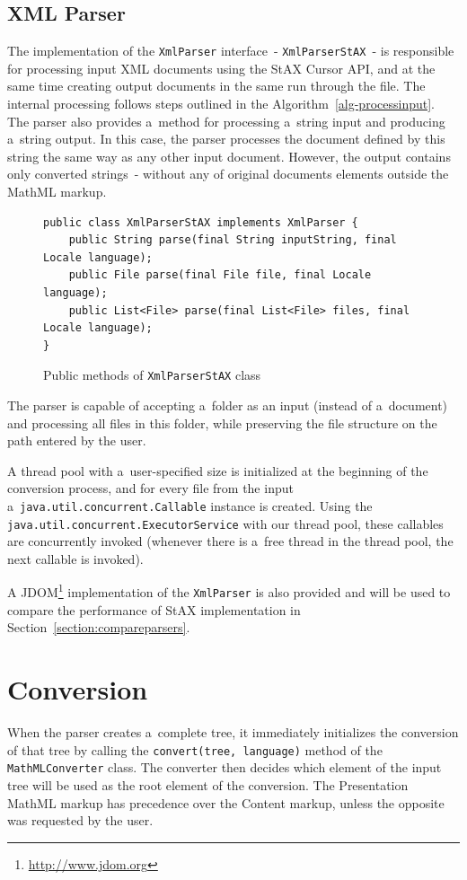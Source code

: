 \documentclass[11pt,oneside,final]{fithesis2}
\def\s#1{#1\index{#1}}
\begin{document}
\subsection{XML Parser}
The implementation of the \texttt{XmlParser} interface~- \texttt{XmlParserStAX}~- is responsible for processing input XML documents using the StAX Cursor API, and at the same time creating output documents in the same run through the file. The internal processing follows steps outlined in the Algorithm~\ref{alg-processinput}. The parser also provides a~method for processing a~string input and producing a~string output. In this case, the parser processes the document defined by this string the same way as any other input document. However, the output contains only converted strings~- without any of original documents elements outside the MathML markup.
\begin{figure}[!ht]
\begin{lstlisting}
public class XmlParserStAX implements XmlParser {
	public String parse(final String inputString, final Locale language);
	public File parse(final File file, final Locale language);
	public List<File> parse(final List<File> files, final Locale language);
}
\end{lstlisting}
\caption{Public methods of \texttt{XmlParserStAX} class}
\label{fig:xmlparserstax}
\end{figure}

The parser is capable of accepting a~folder as an input (instead of a~document) and processing all files in this folder, while preserving the file structure on the path entered by the user. 

A thread pool with a~user-specified size is initialized at the beginning of the conversion process, and for every file from the input a~\texttt{java.util.concurrent.Callable} instance is created. Using the \texttt{java.util.concurrent.ExecutorService} with our thread pool, these callables are concurrently invoked (whenever there is a~free thread in the thread pool, the next callable is invoked). 

A JDOM\footnote{\url{http://www.jdom.org}} implementation of the \texttt{XmlParser} is also provided and will be used to compare the performance of StAX implementation in Section~\ref{section:compareparsers}.

\section{Conversion}
When the parser creates a~complete tree, it immediately initializes the \s{conversion} of that tree by calling the \texttt{convert(tree, language)} method of the \texttt{MathMLConverter} class. The converter then decides which element of the input tree will be used as the root element of the conversion. The Presentation MathML markup has precedence over the Content markup, unless the opposite was requested by the user.
\end{document}
